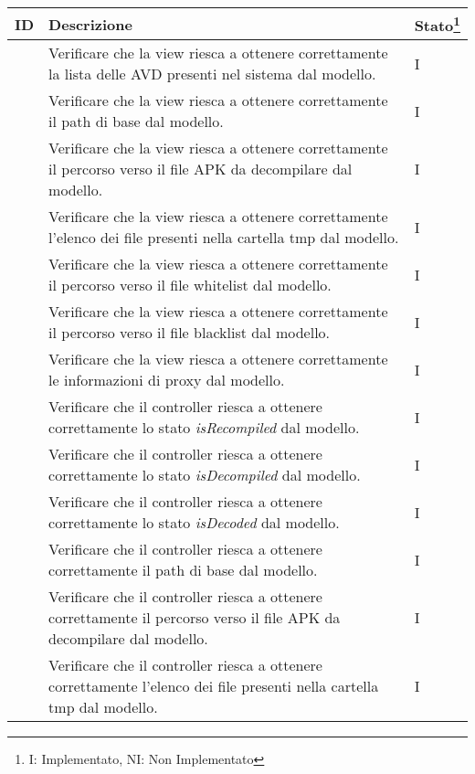 \begin{longtable}{ |C{3cm} | C{8.5cm}| C{1.5cm} |}
    \hline
    \textbf{ID} &
    \textbf{Descrizione} &
    \textbf{Stato\footnote{I: Implementato, NI: Non Implementato}} \\\hline
     & Verificare che la view riesca a ottenere correttamente la lista delle AVD presenti nel sistema dal modello.                & I \\\hline
     & Verificare che la view riesca a ottenere correttamente il path di base dal modello.                                        & I \\\hline
     & Verificare che la view riesca a ottenere correttamente il percorso verso il file APK da decompilare dal modello.           & I \\\hline
     & Verificare che la view riesca a ottenere correttamente l'elenco dei file presenti nella cartella tmp dal modello.          & I \\\hline
     & Verificare che la view riesca a ottenere correttamente il percorso verso il file whitelist dal modello.                    & I \\\hline
     & Verificare che la view riesca a ottenere correttamente il percorso verso il file blacklist dal modello.                    & I \\\hline
     & Verificare che la view riesca a ottenere correttamente le informazioni di proxy dal modello.                               & I \\\hline
     & Verificare che il controller riesca a ottenere correttamente lo stato \textit{isRecompiled} dal modello.                   & I \\\hline
     & Verificare che il controller riesca a ottenere correttamente lo stato \textit{isDecompiled} dal modello.                   & I \\\hline
     & Verificare che il controller riesca a ottenere correttamente lo stato \textit{isDecoded} dal modello.                      & I \\\hline
     & Verificare che il controller riesca a ottenere correttamente il path di base dal modello.                                  & I \\\hline
     & Verificare che il controller riesca a ottenere correttamente il percorso verso il file APK da decompilare dal modello.     & I \\\hline
     & Verificare che il controller riesca a ottenere correttamente l'elenco dei file presenti nella cartella tmp dal modello.    & I \\\hline

\end{longtable}
